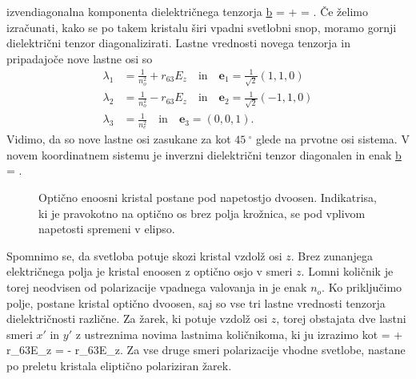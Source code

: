 izvendiagonalna komponenta dielektričnega tenzorja 
\beq
\underline{b} = 
 +  = .
\label{7.8a}
\eeq
Če želimo izračunati, kako se po takem kristalu širi vpadni svetlobni
snop, moramo gornji dielektrični tenzor diagonalizirati. Lastne vrednosti novega tenzorja
in pripadajoče nove lastne osi so
\begin{align}
\lambda_1 &= \frac{1}{n_o^2}+ r_{63}E_z \quad \mathrm{in} \quad \mathbf{e}_1 = \frac{1}{\sqrt{2}}(1,1,0)\\
\lambda_2 &= \frac{1}{n_o^2}- r_{63}E_z \quad \mathrm{in} \quad \mathbf{e}_2 = \frac{1}{\sqrt{2}}(-1,1,0)\\
\lambda_3 &= \frac{1}{n_e^2} \quad \mathrm{in} \quad \mathbf{e}_3 = (0,0,1).
\end{align}
Vidimo, da so nove lastne osi zasukane za kot $45~^\circ$ glede na prvotne osi sistema.
V novem koordinatnem sistemu je inverzni dielektrični tenzor diagonalen in enak
\beq
\underline{b} = 
.
\eeq
\begin{figure}[h]
\centering
\def\svgwidth{60truemm} 

\caption{Optično enoosni kristal postane pod napetostjo dvoosen. Indikatrisa, ki je pravokotno
na optično os brez polja krožnica, se pod vplivom napetosti spremeni v elipso. }
\label{fig:amn}
\end{figure}
Spomnimo se, da svetloba potuje skozi kristal vzdolž osi $z$. Brez zunanjega električnega
polja je kristal enoosen z optično osjo v smeri $z$. Lomni količnik je torej neodvisen od
polarizacije vpadnega valovanja in je enak $n_o$. Ko priključimo polje, postane kristal
optično dvoosen, saj so vse tri lastne vrednosti tenzorja dielektričnosti različne. Za žarek, 
ki potuje vzdolž osi $z$, torej obstajata dve lastni smeri $x'$ in $y'$ z ustreznima
novima lastnima količnikoma, ki ju izrazimo kot
\beq
{} = + r_{63}E_z \quad {} \quad 
{} = - r_{63}E_z. 
\eeq
Za vse druge smeri polarizacije vhodne svetlobe, nastane po preletu kristala eliptično polariziran žarek.

